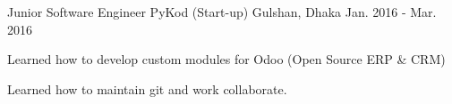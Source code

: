 

\begin{cventries}

  \cventry
    {Junior Software Engineer} %
    {PyKod (Start-up)} %
    {Gulshan, Dhaka} %
    {Jan. 2016 - Mar. 2016} %
    {
      \begin{cvitems} %
        \item {Learned how to develop custom modules for Odoo (Open Source ERP \& CRM)}
        \item {Learned how to maintain git and work collaborate.}
      \end{cvitems}
    }
\end{cventries}
